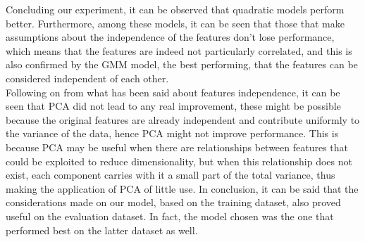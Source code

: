 
Concluding our experiment, it can be observed that quadratic models perform better.
Furthermore, among these models, it can be seen that those that make assumptions about the independence of the features don't lose performance,
which means that the features are indeed not particularly correlated, and this is also confirmed by the GMM model, the best performing,
that the features can be considered independent of each other.\\
Following on from what has been said about features independence, it can be seen that PCA did not lead to any real improvement,
these might be possible because the original features are already independent and contribute uniformly to the variance of the data,
hence PCA might not improve performance.
This is because PCA may be useful when there are relationships between features that could be exploited to reduce dimensionality,
but when this relationship does not exist, each component carries with it a small part of the total variance,
thus making the application of PCA of little use.
In conclusion, it can be said that the considerations made on our model, based on the training dataset, also proved useful on the evaluation dataset.
In fact, the model chosen was the one that performed best on the latter dataset as well.